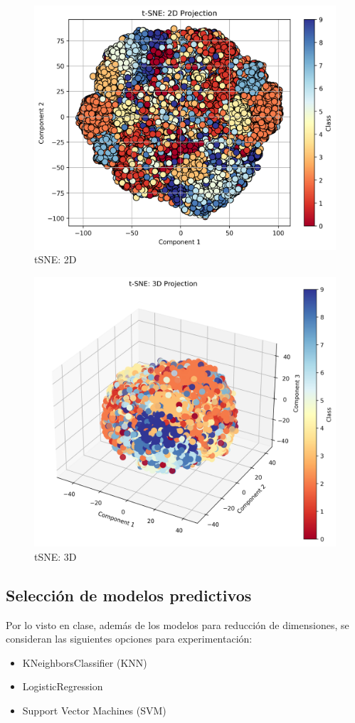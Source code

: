 \documentclass[journal]{IEEEtran}
\begin{document}
\begin{figure}[H]
        \centering
        \includegraphics[width=0.9\linewidth]{figures/tsne_2d_projection.png}
        \caption{tSNE: 2D}
        \label{fig:tsne_2d}
\end{figure}
\begin{figure}[H]
        \centering
        \includegraphics[width=0.9\linewidth]{figures/tsne_3d_projection.png}
        \caption{tSNE: 3D}
        \label{fig:tsne_3d}
\end{figure}

\subsection{Selección de modelos predictivos}
Por lo visto en clase, además de los modelos para reducción de dimensiones, se consideran las siguientes opciones para experimentación:
\begin{itemize}
        \item KNeighborsClassifier (KNN)\cite{scikit-learn-knn}
        \item LogisticRegression\cite{scikit-learn-logreg}
        \item Support Vector Machines (SVM)\cite{scikit-learn-svm}
\end{itemize}
\end{document}
